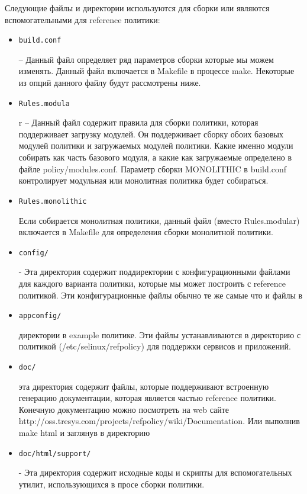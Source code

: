 \documentclass{./../class/UIR}
\begin{document}
Следующие файлы и директории используются для сборки или являются
вспомогательными для reference политики:
	\begin{itemize}
\item \begin{verbatim}build.conf\end{verbatim} – Данный файл определяет ряд
параметров сборки которые мы можем изменять.  Данный файл включается в Makefile
в процессе make. Некоторые из опций данного файлу будут рассмотрены ниже.
\item \begin{verbatim}Rules.modula\end{verbatim}r – Данный файл содержит правила
для сборки политики, которая поддерживает загрузку модулей. Он поддерживает
сборку обоих базовых модулей политики и загружаемых модулей политики. Какие
именно модули собирать как часть базового модуля, а какие как загружаемые
определено в файле policy/modules.conf. Параметр сборки MONOLITHIC в build.conf
контролирует модульная или монолитная политика будет собираться.
\item \begin{verbatim}Rules.monolithic\end{verbatim} Если собирается монолитная
политики, данный файл (вместо Rules.modular) включается в Makefile для
определения сборки монолитной политики.
\item \begin{verbatim}config/\end{verbatim} - Эта директория содержит
поддиректории с конфигурационными файлами для каждого варианта политики, которые
мы может построить с reference политикой. Эти конфигурационные файлы обычно те
же самые что и файлы в
\item \begin{verbatim}appconfig/\end{verbatim} директории в example политике.
Эти файлы устанавливаются в директорию с политикой (/etc/selinux/refpolicy) для
поддержки сервисов и приложений.
\item \begin{verbatim}doc/\end{verbatim} эта директория содержит файлы, которые
поддерживают встроенную генерацию документации, которая является частью
reference политики.  Конечную документацию можно посмотреть на web сайте
http://oss.tresys.com/projects/refpolicy/wiki/Documentation. Или выполнив make
html и заглянув в директорию
\item \begin{verbatim}doc/html/support/\end{verbatim} - Эта директория содержит
исходные коды и скрипты для вспомогательных утилит, использующихся в просе
сборки политики.
	\end{itemize}
	
\end{document}
